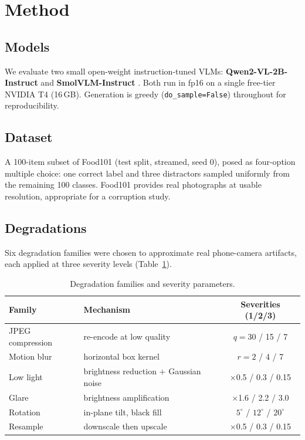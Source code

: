 \documentclass[11pt]{article}
\begin{document}
\section{Method}

\subsection{Models}

We evaluate two small open-weight instruction-tuned VLMs:
\textbf{Qwen2-VL-2B-Instruct} \citep{wang2024qwen2vl} and
\textbf{SmolVLM-Instruct} \citep{smolvlm}. Both run in fp16 on a single free-tier NVIDIA T4
(16\,GB). Generation is greedy (\texttt{do\_sample=False}) throughout for
reproducibility.

\subsection{Dataset}

A 100-item subset of Food101 \citep{bossard2014food101} (test split, streamed, seed 0), posed as four-option
multiple choice: one correct label and three distractors sampled uniformly from
the remaining 100 classes. Food101 provides real photographs at usable
resolution, appropriate for a corruption study.

\subsection{Degradations}

Six degradation families were chosen to approximate real phone-camera artifacts,
each applied at three severity levels (Table~\ref{tab:degradations}).

\begin{table}[h]
\centering
\caption{Degradation families and severity parameters.}
\label{tab:degradations}
\begin{tabular}{llc}
\toprule
Family & Mechanism & Severities (1/2/3) \\
\midrule
JPEG compression & re-encode at low quality & $q = 30$ / 15 / 7 \\
Motion blur & horizontal box kernel & $r = 2$ / 4 / 7 \\
Low light & brightness reduction $+$ Gaussian noise & $\times$0.5 / 0.3 / 0.15 \\
Glare & brightness amplification & $\times$1.6 / 2.2 / 3.0 \\
Rotation & in-plane tilt, black fill & $5^\circ$ / $12^\circ$ / $20^\circ$ \\
Resample & downscale then upscale & $\times$0.5 / 0.3 / 0.15 \\
\bottomrule
\end{tabular}
\end{table}
\end{document}
